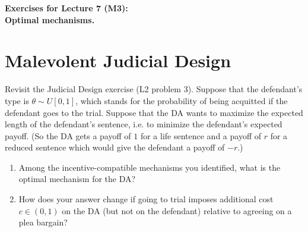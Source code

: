 \documentclass[a4paper]{article}
\newif\ifsolutions
\begin{document}
\begin{center}
		\LARGE\textbf{Exercises for Lecture 7 (M3):\\ Optimal mechanisms.}
\end{center}



\section{Malevolent Judicial Design}
	Revisit the Judicial Design exercise (L2 problem 3). Suppose that the defendant's type is $\theta \sim U[0,1]$, which stands for the probability of being acquitted if the defendant goes to the trial. Suppose that the DA wants to maximize the expected length of the defendant's sentence, i.e. to minimize the defendant's expected payoff. (So the DA gets a payoff of $1$ for a life sentence and a payoff of $r$ for a reduced sentence which would give the defendant a payoff of $-r$.)  
	\begin{enumerate}
		\item Among the incentive-compatible mechanisms you identified, what is the optimal mechanism for the DA?
		\item How does your answer change if going to trial imposes additional cost $c \in (0,1)$ on the DA (but not on the defendant) relative to agreeing on a plea bargain?
	\end{enumerate}
	
\ifsolutions
\end{document}

